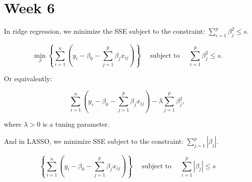 \documentclass[
  letterpaper,
  DIV=11,
  numbers=noendperiod]{scrreport}
\begin{document}

\hypertarget{week-6}{%
\chapter{Week 6}\label{week-6}}

In ridge regression, we minimize the SSE subject to the constraint:
\(\sum_{i=1}^p \beta_j^2 \leq s\).

\[
\min_{\beta} \left\{ \sum_{i=1}^n \left( y_i - \beta_0 - \sum_{j=1}^p \beta_j x_{ij} \right) \right\} \quad \text{ subject to } \quad \sum_{i=1}^p \beta_j^2 \leq s.
\]

Or equivalently:

\[
\sum_{i=1}^n \left( y_i - \beta_0 - \sum_{j=1}^p \beta_j x_{ij} \right) - \lambda \sum_{j=1}^p \beta_j^2,
\]

where \(\lambda > 0\) is a tuning parameter.

And in LASSO, we minimize SSE subject to the constraint:
\(\sum_{j=1}^p |\beta_j|.\)

\[
\left\{ \sum_{i=1}^n \left( y_i - \beta_0 - \sum_{j=1}^p \beta_j x_{ij} \right) \right\} \quad \text{ subject to } \quad \sum_{i=1}^p |\beta_j| \leq s
\]
\end{document}
